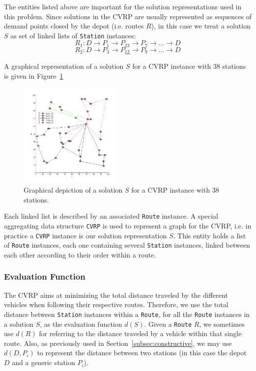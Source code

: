 The entities listed above are important for the solution representations used in 
this problem. Since solutions in the CVRP are usually represented as sequences 
of demand points closed by the depot (i.e. routes $R$), in this case 
we treat a solution $S$ as set of linked lists of \verb?Station? instances:
\[R_1: D \rightarrow P_1 \rightarrow P_{23} \rightarrow P_7 \rightarrow ... \rightarrow D \] 
\[R_2: D \rightarrow P_3 \rightarrow P_{12} \rightarrow P_9 \rightarrow ... \rightarrow D \] 
\[ ... \] 

A graphical representation of a solution $S$ for a CVRP instance with 38 
stations is given in Figure~\ref{fig:solution-example}

\begin{figure}[h!]
    \centering

    \includegraphics[width=0.45\textwidth] {figures/A-n38-k5-s-ga.png}
    \cprotect\caption{Graphical depiction of a solution $S$ for a CVRP instance 
        with 38 stations.}
    \label{fig:solution-example}

\end{figure}

Each 
linked list is described by an associated \verb?Route? instance. A special 
aggregating data structure \verb?CVRP? is used to represent a graph for the 
CVRP, i.e. in practice a \verb+CVRP+ instance is our solution representation 
$S$. This entity holds a list of \verb?Route? instances, each one 
containing several \verb?Station? instances, linked between each other 
according to their order within a route.\vertbreak

\subsubsection{Evaluation Function}
\label{subsubsec:eval-fun}

The CVRP aims at minimizing the total distance traveled by the different 
vehicles when following their respective routes. Therefore, we use the total 
distance between \verb+Station+ instances within a \verb+Route+, for all the 
\verb+Route+ instances in a solution $S$, as the evaluation function 
$d(S)$. Given a \verb+Route+ $R$, we sometimes use $d(R)$ for referring to 
the distance traveled by a vehicle within that single route. Also, as 
previously used in Section~\ref{subsec:constructive}, we may use $d(D,P_i)$ to 
represent the distance between two stations (in this case the depot $D$ and 
a generic station $P_i$).

